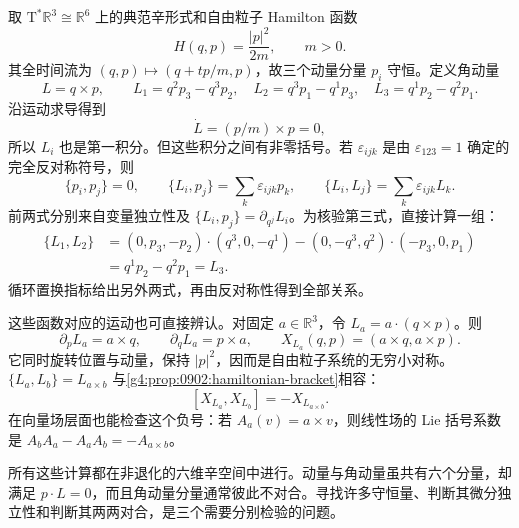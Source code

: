 \begin{example}\label{g4:exm:0902:free-angular-momentum}
	取 \(\mathrm{T}^*\mathbb R^3\cong\mathbb R^6\) 上的典范辛形式和自由粒子 Hamilton 函数
	\[
		H(q,p)=\frac{|p|^2}{2m},\qquad m>0.
	\]
	其全时间流为 \((q,p)\mapsto(q+tp/m,p)\)，故三个动量分量 \(p_i\) 守恒。定义角动量
	\[
		L=q\times p,\qquad
		L_1=q^2p_3-q^3p_2,\quad
		L_2=q^3p_1-q^1p_3,\quad
		L_3=q^1p_2-q^2p_1.
	\]
	沿运动求导得到
	\[
		\dot L=(p/m)\times p=0,
	\]
	所以 \(L_i\) 也是第一积分。但这些积分之间有非零括号。若 \(\varepsilon_{ijk}\) 是由 \(\varepsilon_{123}=1\) 确定的完全反对称符号，则
	\begin{equation}\label{g4:eq:0902:angular-brackets}
		\{p_i,p_j\}=0,\qquad
		\{L_i,p_j\}=\sum_k\varepsilon_{ijk}p_k,\qquad
		\{L_i,L_j\}=\sum_k\varepsilon_{ijk}L_k.
	\end{equation}
	前两式分别来自变量独立性及
	\(\{L_i,p_j\}=\partial_{q^j}L_i\)。为核验第三式，直接计算一组：
	\[
		\begin{aligned}
			\{L_1,L_2\}
			&=(0,p_3,-p_2)\cdot(q^3,0,-q^1)
			 -(0,-q^3,q^2)\cdot(-p_3,0,p_1)\\
			&=q^1p_2-q^2p_1=L_3.
		\end{aligned}
	\]
	循环置换指标给出另外两式，再由反对称性得到全部关系。

	这些函数对应的运动也可直接辨认。对固定 \(a\in\mathbb R^3\)，令 \(L_a=a\cdot(q\times p)\)。则
	\[
		\partial_pL_a=a\times q,\qquad
		\partial_qL_a=p\times a,\qquad
		X_{L_a}(q,p)=(a\times q,a\times p).
	\]
	它同时旋转位置与动量，保持 \(|p|^2\)，因而是自由粒子系统的无穷小对称。\(\{L_a,L_b\}=L_{a\times b}\) 与\cref{g4:prop:0902:hamiltonian-bracket}相容：
	\[
		[X_{L_a},X_{L_b}]=-X_{L_{a\times b}}.
	\]
	在向量场层面也能检查这个负号：若 \(A_a(v)=a\times v\)，则线性场的 Lie 括号系数是 \(A_bA_a-A_aA_b=-A_{a\times b}\)。

	所有这些计算都在非退化的六维辛空间中进行。动量与角动量虽共有六个分量，却满足 \(p\cdot L=0\)，而且角动量分量通常彼此不对合。寻找许多守恒量、判断其微分独立性和判断其两两对合，是三个需要分别检验的问题。
\end{example}
